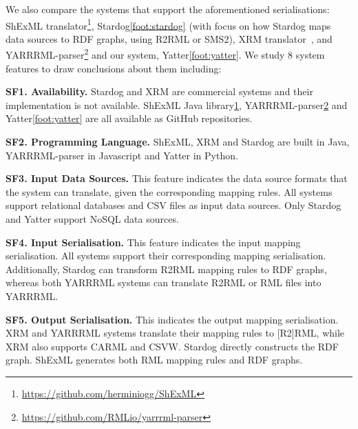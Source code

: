We also compare the systems that support the aforementioned serialisations: 
ShExML translator\footnote{\label{foot:shexml}\url{https://github.com/herminiogg/ShExML}}, %
Stardog\cref{foot:stardog} %
(with focus on how Stardog maps data sources to RDF graphs, using R2RML or SMS2),
XRM translator~\citep{xrm}, and
YARRRML-parser\footnote{\label{foot:yarrrml-p}\url{https://github.com/RMLio/yarrrml-parser}} and our system, Yatter\cref{foot:yatter}. 
We study 8 system features to draw conclusions about them including:

\textbf{SF1. Availability.}
Stardog and XRM are commercial systems and their implementation is not available. ShExML Java library\cref{foot:shexml}, YARRRML-parser\cref{foot:yarrrml-p} and Yatter\cref{foot:yatter} are all available as GitHub repositories. 

\textbf{SF2. Programming Language.} ShExML, XRM and Stardog are built in Java, YARRRML-parser in Javascript and Yatter in Python.

\textbf{SF3. Input Data Sources.} This feature indicates the data source formats that the system can translate, given the corresponding mapping rules. 
All systems support relational databases and CSV files as input data sources. Only Stardog and Yatter support NoSQL data sources.


\textbf{SF4. Input Serialisation.}
This feature indicates the input mapping serialisation. 
All systems support their corresponding mapping serialisation. 
Additionally, Stardog can transform R2RML mapping rules to RDF graphs, whereas both YARRRML systems can translate R2RML or RML files into YARRRML.

\textbf{SF5. Output Serialisation.} 
This indicates the output mapping serialisation. 
XRM and YARRRML systems translate their mapping rules to [R2]RML, while XRM also supports CARML and CSVW. 
Stardog directly constructs the RDF graph. 
ShExML generates both RML mapping rules and RDF graphs.

